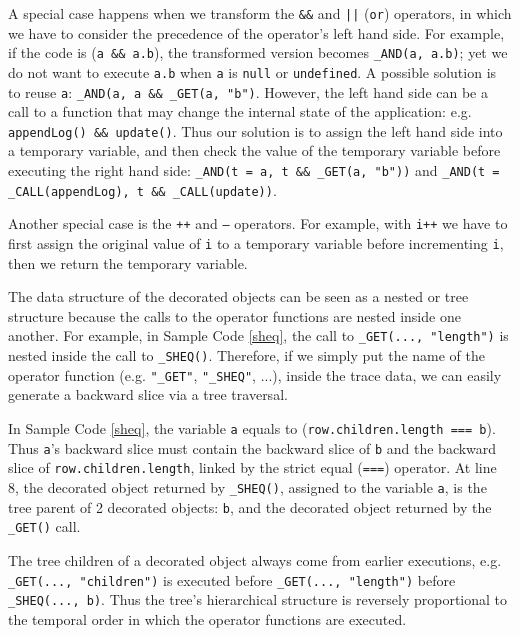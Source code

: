 A special case happens when we transform the {\tt \&\&} and {\tt |}{\tt |} ({\tt or}) operators, in which we have to consider the precedence of the operator's left hand side.   
For example, if the code is ({\tt a \&\& a.b}), the transformed version becomes {\tt \_AND(a, a.b)}; yet we do not want to execute {\tt a.b} when {\tt a} is {\tt null} or {\tt undefined}.  
A possible solution is to reuse {\tt a}: {\tt \_AND(a, a \&\& \_GET(a, "b")}.  
However, the left hand side can be a call to a function that may change the internal state of the application: e.g. {\tt appendLog() \&\& update()}.
Thus our solution is to assign the left hand side into a temporary variable, and then check the value of the temporary variable before executing the right hand side: 
{\tt \_AND(t = a, t \&\& \_GET(a, "b"))} and {\tt \_AND(t = \_CALL(appendLog), t \&\& \_CALL(update))}.  

Another special case is the {\tt ++} and {\tt ---} operators.  
For example, with {\tt i++} we have to first assign the original value of {\tt i} to a temporary variable before incrementing {\tt i}, then we return the temporary variable.


The data structure of the decorated objects can be seen as a nested or tree structure because the calls to the operator functions are nested inside one another.  
For example, in Sample Code \ref{sheq}, the call to {\tt \_GET(..., "length")} is nested inside the call to {\tt \_SHEQ()}.  
Therefore, if we simply put the name of the operator function (e.g. {\tt "\_GET"}, {\tt "\_SHEQ"}, ...), inside the trace data, we can easily generate a backward slice via a tree traversal.  

In Sample Code \ref{sheq}, the variable {\tt a} equals to ({\tt row.children.length === b}).  
Thus {\tt a}'s backward slice must contain the backward slice of {\tt b} and the backward slice of {\tt row.children.length}, linked by the strict equal ({\tt ===}) operator.  
At line 8, the decorated object returned by {\tt \_SHEQ()}, assigned to the variable {\tt a}, is the tree parent of 2 decorated objects: {\tt b}, and the decorated object returned by the {\tt \_GET()} call.  

The tree children of a decorated object always come from earlier executions, e.g. {\tt \_GET(..., "children")} is executed before {\tt \_GET(..., "length")} before {\tt \_SHEQ(..., b)}.
Thus the tree's hierarchical structure is reversely proportional to the temporal order in which the operator functions are executed.  

